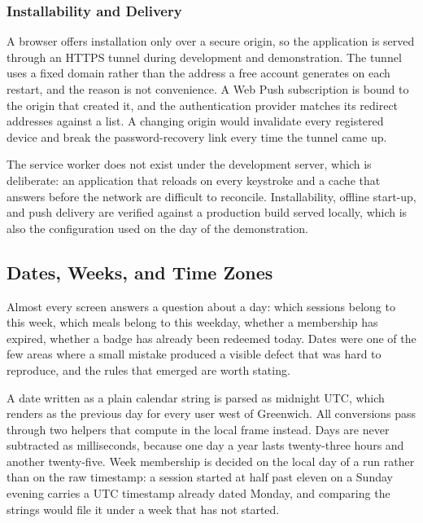 \subsubsection{Installability and Delivery}\label{subsubsect:InstallabilityDelivery}

A browser offers installation only over a secure origin, so the application is served through an HTTPS tunnel during development and demonstration. The tunnel uses a fixed domain rather than the address a free account generates on each restart, and the reason is not convenience. A Web Push subscription is bound to the origin that created it, and the authentication provider matches its redirect addresses against a list. A changing origin would invalidate every registered device and break the password-recovery link every time the tunnel came up.

The service worker does not exist under the development server, which is deliberate: an application that reloads on every keystroke and a cache that answers before the network are difficult to reconcile. Installability, offline start-up, and push delivery are verified against a production build served locally, which is also the configuration used on the day of the demonstration.

\subsection{Dates, Weeks, and Time Zones}\label{subsect:DatesWeeks}

Almost every screen answers a question about a day: which sessions belong to this week, which meals belong to this weekday, whether a membership has expired, whether a badge has already been redeemed today. Dates were one of the few areas where a small mistake produced a visible defect that was hard to reproduce, and the rules that emerged are worth stating.

A date written as a plain calendar string is parsed as midnight UTC, which renders as the previous day for every user west of Greenwich. All conversions pass through two helpers that compute in the local frame instead. Days are never subtracted as milliseconds, because one day a year lasts twenty-three hours and another twenty-five. Week membership is decided on the local day of a run rather than on the raw timestamp: a session started at half past eleven on a Sunday evening carries a UTC timestamp already dated Monday, and comparing the strings would file it under a week that has not started.


